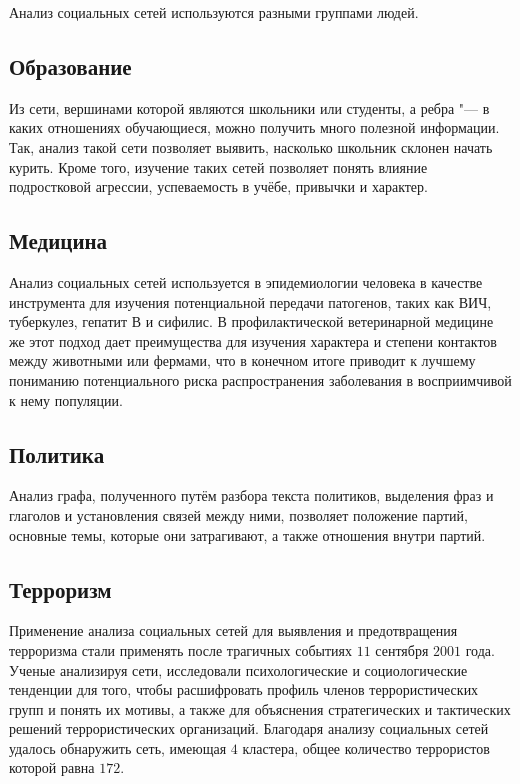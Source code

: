 Анализ социальных сетей используются разными группами людей.
\subsection{Образование}
Из сети, вершинами которой являются школьники или студенты, а ребра "--- в каких отношениях обучающиеся, можно получить много полезной информации. Так, анализ такой сети позволяет выявить, насколько школьник склонен начать курить\cite{mercken2012longitudinal}. Кроме того, изучение таких сетей позволяет понять влияние подростковой агрессии\cite{sijtsema2010forms}, успеваемость в учёбе, привычки и характер.

\subsection{Медицина}
Анализ социальных сетей используется в эпидемиологии человека в качестве инструмента для изучения потенциальной передачи патогенов, таких как ВИЧ, туберкулез, гепатит В и сифилис. В профилактической ветеринарной медицине же этот подход дает преимущества для изучения характера и степени контактов между животными или фермами, что в конечном итоге приводит к
лучшему пониманию потенциального риска распространения заболевания в восприимчивой к нему
популяции\cite{martinez2009social}.


\subsection{Политика}
Анализ графа, полученного путём разбора текста политиков, выделения фраз и глаголов и установления связей между ними, позволяет положение партий, основные темы, которые они затрагивают, а также отношения внутри партий\cite{politics}. 

\subsection{Терроризм}
Применение анализа социальных сетей для выявления и предотвращения терроризма стали применять после трагичных событиях $11$ сентября $2001$ года. Ученые анализируя сети, исследовали психологические и социологические тенденции для того, чтобы расшифровать профиль членов террористических групп и понять их мотивы, а также для объяснения стратегических и тактических решений террористических организаций\cite{perliger2011social}.
Благодаря анализу социальных сетей удалось обнаружить сеть, имеющая $4$ кластера, общее количество террористов которой равна $172$\cite{sageman2004understanding}.

